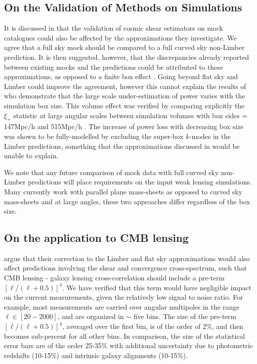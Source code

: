 \subsection{On the Validation of Methods on Simulations}
It is discussed in \citet{kitching/etal:2016} that the validation of cosmic shear estimators on mock catalogues could also be affected by the approximations they investigate.  We agree that a full sky mock should be compared to a full curved sky non-Limber prediction.  It is then suggested, however, that the discrepancies already reported between existing mocks and the predictions could be attributed to these approximations, as opposed to a finite box effect \citep{kiessling/etal:2011, harnois-deraps/etal:2012, harnois-deraps/vanwaerbeke:2015}.  Going beyond flat sky and Limber could improve the agreement, however this cannot explain the results of \citet{harnois-deraps/vanwaerbeke:2015} who demonstrate that the large scale under-estimation of power varies with the simulation box size. This volume effect was verified by comparing explicitly the $\xi_+$ statistic at large angular scales between simulation volumes with box sides = 147Mpc/h and 515Mpc/h \citep[see Fig. 5 in][]{harnois-deraps/vanwaerbeke:2015}. The increase of power loss with decreasing box size was shown to be fully-modelled by excluding the super-box $k$-modes in the Limber predictions, something that the approximations discussed in \citet{kitching/etal:2016} would be unable to explain.

We note that any future comparison of mock data with full curved sky non-Limber predictions will place requirements on the input weak lensing simulations.  Many currently work with parallel plane mass-sheets as opposed to curved sky mass-sheets and at large angles, these two approaches differ regardless of the box size. 

\subsection{On the application to CMB lensing}
\citet{kitching/etal:2016} argue that their correction to the Limber and flat sky approximations would also affect predictions involving the shear and convergence cross-spectrum, such that CMB lensing - galaxy lensing cross-correlation should include a pre-term $[\ell/(\ell+0.5)]^4$.   We have verified that this term would have negligible impact on the current measurements, given the relatively low signal to noise ratio. For example, most measurements \citep{hand/etal:2015, liu/hill:2015, kirk/etal:2016,harnois-deraps/etal:2016} are carried over angular multipoles in the range $\ell \in [20-2000]$, and are organized in $\sim$ five bins. The size of the pre-term $[\ell/(\ell+0.5)]^4$, averaged over the first bin, is of the order of 2\%, and then becomes sub-percent for all other bins. In comparison, the size of the statistical error bars are of the order 25-35\% with additional uncertainty due to photometric redshifts (10-15\%) and intrinsic galaxy alignments (10-15\%).





